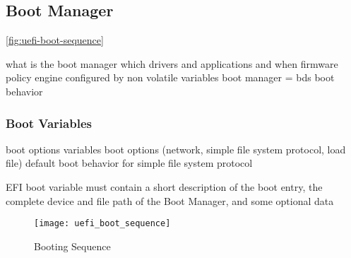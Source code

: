 \subsection{Boot Manager}

\autoref{fig:uefi-boot-sequence}

what is the boot manager
which drivers and applications and when
firmware policy engine
configured by non volatile variables
\cite[3.1.]{uefi-spec}
boot manager = bds
boot behavior
\subsubsection{Boot Variables}
\label{sec:uefi-pi:uefi:boot-manager:boot-variables}
boot options variables
boot options (network, simple file system protocol, load file)
default boot behavior for simple file system protocol

EFI boot variable must contain a short description of the boot entry, the complete
device and file path of the Boot Manager, and some optional data
\cite{windows-internals-7-part2}

\begin{figure}[htb]%
    \centering%
    \texttt{[image: uefi\_boot\_sequence]}%
    \caption{Booting Sequence \cite[Figure 2-1]{uefi-spec}}%
    \label{fig:uefi-boot-sequence}%
\end{figure}


